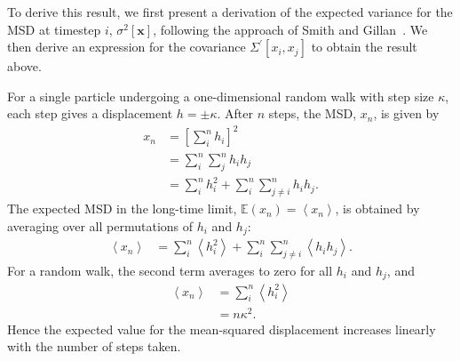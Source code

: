 \documentclass[reprint,superscriptaddress,nobibnotes,amsmath,amssymb,aps,prx,hidelinks,linenumbers]{revtex4-2}
\newcommand{\oMSD}{\ensuremath{\bm{x}}}
\newcommand{\oMSDi}{\ensuremath{x_i}}
\newcommand{\oMSDj}{\ensuremath{x_j}}
\newcommand{\oMSDn}{\ensuremath{x_n}}
\newcommand{\moMSDn}{\ensuremath{\left<\oMSDn\right>}}
\newcommand{\var}[1]{\ensuremath{\sigma^2[#1]}}
\begin{document}
To derive this result, we first present a derivation of the expected variance for the MSD at timestep $i$, $\var{\oMSD}$, following the approach of Smith and Gillan~\cite{smith_random_1996}.
We then derive an expression for the covariance $\Sigma^\prime\left[\oMSDi, \oMSDj\right]$ to obtain the result above.

For a single particle undergoing a one-dimensional random walk with step size $\kappa$, each step gives a displacement $h = \pm \kappa$.
After $n$ steps, the MSD, $\oMSDn$, is given by
\begin{equation}
  \begin{aligned}
    \oMSDn &= \left[\sum_i^n h_i\right]^2\\
           &= \sum_i^n\sum_j^n h_i h_j \\
           &= \sum_i^n h_i^2 + \sum_i^n\sum_{j\neq i}^n h_ih_j.
  \end{aligned}
\end{equation}
The expected MSD in the long-time limit, $\mathbb{E}(\oMSDn) = \moMSDn$, is obtained by averaging over all permutations of $h_i$ and $h_j$:
\begin{equation}
  \begin{aligned}
    \moMSDn &= \sum_i^n \left<h_i^2\right> + \sum_i^n\sum_{j\neq i}^n\left<h_i h_j\right>.
  \end{aligned}
\end{equation}
For a random walk, the second term averages to zero for all $h_i$ and $h_j$, and
\begin{equation}
  \begin{aligned}
    \moMSDn &= \sum_i^n \left<h_i^2\right> \\
            &= n\kappa^2.
  \end{aligned}
  \label{equ:msd_SI}
\end{equation}
Hence the expected value for the mean-squared displacement increases linearly with the number of steps taken.
\end{document}
